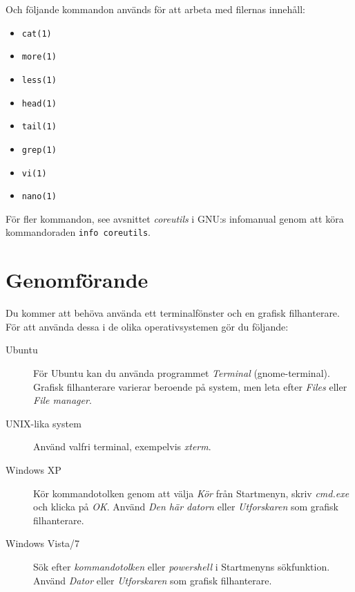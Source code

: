 \documentclass[a4paper]{miunasgn}
\begin{document}
Och följande kommandon används för att arbeta med filernas innehåll:
\begin{itemize}
  \item \texttt{cat(1)}
  \item \texttt{more(1)}
  \item \texttt{less(1)}
  \item \texttt{head(1)}
  \item \texttt{tail(1)}
  \item \texttt{grep(1)}
  \item \texttt{vi(1)}
  \item \texttt{nano(1)}
\end{itemize}

För fler kommandon, see avsnittet \emph{coreutils} i GNU:s infomanual genom att 
köra kommandoraden \texttt{info coreutils}.


\section{Genomförande}
\label{sec:Genomforande}
\noindent
Du kommer att behöva använda ett terminalfönster och en grafisk filhanterare.
För att använda dessa i de olika operativsystemen gör du följande:
\begin{description}
	\item[Ubuntu] För Ubuntu kan du använda programmet \emph{Terminal} 
		(gnome-terminal).
		Grafisk filhanterare varierar beroende på system, men leta efter 
		\emph{Files} eller \emph{File manager}.
	\item[UNIX-lika system] Använd valfri terminal, exempelvis \emph{xterm}.
	\item[Windows XP] Kör kommandotolken genom att välja \emph{Kör} från
		Startmenyn, skriv \emph{cmd.exe} och klicka på \emph{OK}.
		Använd \emph{Den här datorn} eller \emph{Utforskaren} som grafisk
		filhanterare.
	\item[Windows Vista/7] Sök efter \emph{kommandotolken} eller
		\emph{powershell} i Startmenyns sökfunktion.
		Använd \emph{Dator} eller \emph{Utforskaren} som grafisk filhanterare.
\end{description}
\end{document}
